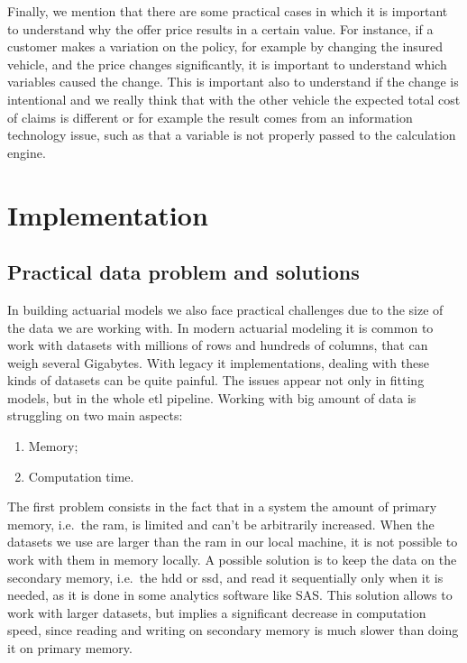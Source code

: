 \documentclass[a4paper, twoside, openright, 12pt]{report}
\providecommand{\tightlist}{%
  \setlength{\itemsep}{0pt}\setlength{\parskip}{0pt}}
\theoremstyle{definition}
\theoremstyle{definition}
\theoremstyle{definition}
\theoremstyle{remark}
\begin{document}
Finally, we mention that there are some practical cases in which it is important to understand why the offer price results in a certain value. For instance, if a customer makes a variation on the policy, for example by changing the insured vehicle, and the price changes significantly, it is important to understand which variables caused the change. This is important also to understand if the change is intentional and we really think that with the other vehicle the expected total cost of claims is different or for example the result comes from an information technology issue, such as that a variable is not properly passed to the calculation engine.

\newpage

\hypertarget{chap:implementation}{%
\section{Implementation}\label{chap:implementation}}

\hypertarget{practical-data-problem-and-solutions}{%
\subsection{Practical data problem and solutions}\label{practical-data-problem-and-solutions}}

In building actuarial models we also face practical challenges due to the size of the data we are working with. In modern actuarial modeling it is common to work with datasets with millions of rows and hundreds of columns, that can weigh several Gigabytes. With legacy \ac{it} implementations, dealing with these kinds of datasets can be quite painful. The issues appear not only in fitting models, but in the whole \ac{etl} pipeline. Working with big amount of data is struggling on two main aspects:

\begin{enumerate}
\def\labelenumi{\arabic{enumi}.}
\tightlist
\item
  Memory;
\item
  Computation time.
\end{enumerate}

The first problem consists in the fact that in a system the amount of primary memory, i.e.~the \ac{ram}, is limited and can't be arbitrarily increased. When the datasets we use are larger than the \ac{ram} in our local machine, it is not possible to work with them in memory locally. A possible solution is to keep the data on the secondary memory, i.e.~the \ac{hdd} or \ac{ssd}, and read it sequentially only when it is needed, as it is done in some analytics software like SAS. This solution allows to work with larger datasets, but implies a significant decrease in computation speed, since reading and writing on secondary memory is much slower than doing it on primary memory.
\end{document}
